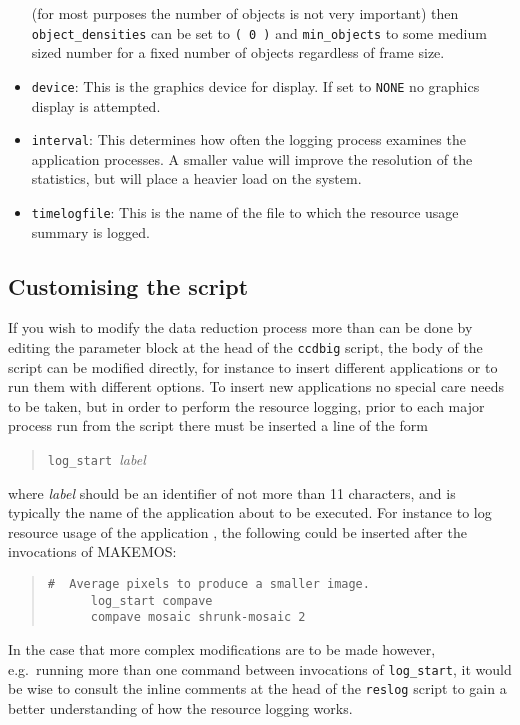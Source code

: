 \begin{itemize}
(for most purposes the number of objects is not very important)
then {\tt object\_densities} can be set to {\tt ( 0 )} and
{\tt min\_objects} to some medium sized number for a fixed
number of objects regardless of frame size.
%
\item {\tt device}:
This is the graphics device for display.
If set to {\tt NONE} no graphics display is attempted.
%
\item {\tt interval}:
This determines how often the logging process examines the 
application processes. 
A smaller value will improve the resolution of the statistics,
but will place a heavier load on the system.
%
\item {\tt timelogfile}:
This is the name of the file to which the resource usage summary is logged.
\end{itemize}


\subsection{Customising the script}
 \label{sec:adapt}

If you wish to modify the data reduction process more
than can be done by editing the parameter block
at the head of the {\tt ccdbig} script,
the body of the script can be modified directly,
for instance to insert different applications or 
to run them with different options.
To insert new applications no special
care needs to be taken, but in order to perform the 
resource logging, 
prior to each major process run from the script
there must be inserted a line of the form
\begin{quote}
{\tt log\_start}\ {\it label}
\end{quote}
where {\it label} should be an identifier of not more
than 11 characters, 
and is typically the name of the application about to be executed.
For instance to log resource usage of the {\KAPPAref}
application ,
the following could be inserted
after the invocations of MAKEMOS:
\begin{quote}
\begin{verbatim}
#  Average pixels to produce a smaller image.
      log_start compave
      compave mosaic shrunk-mosaic 2
\end{verbatim}
\end{quote}

In the case that more complex modifications are to be
made however, e.g.\ running more than one command 
between invocations of {\tt log\_start}, 
it would be wise to consult the inline comments 
at the head of the {\tt reslog}
script to gain a better understanding of how the
resource logging works.



